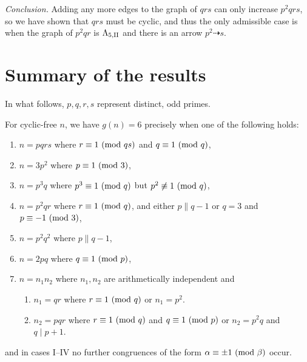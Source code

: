 \emph{Conclusion.} Adding any more edges to the graph of $qrs$ can only increase $p^2 q r s$, so we have shown that $qrs$ must be cyclic, and thus the only admissible case is when the graph of $p^2 q r$ is $\Lambda_{5,\text{II}}$ and there is an arrow $p^2 \dashrightarrow s$.

\section{Summary of the results}
In what follows, $p, q, r, s$ represent distinct, odd primes.
\begin{thm}
	For cyclic-free $n$, we have $g(n) = 6$ precisely when one of the following holds:
	\begin{enumerate} \listspace
		\item $n = pqrs$ where $r \equiv 1 \ (\mathrm{mod} \ qs)$ and $q \equiv 1 \ (\mathrm{mod} \ q)$,
		\item $n = 3p^2$ where $p \equiv 1 \ (\mathrm{mod} \ 3)$,
		\item $n = p^3 q$ where $p^3 \equiv 1 \ (\mathrm{mod} \ q)$ but $p^2 \not\equiv 1 \ (\mathrm{mod} \ q)$,
		\item $n = p^2 q r$ where $r \equiv 1 \ (\mathrm{mod} \ q)$, and either $p \parallel q - 1$ or $q = 3$ and $p \equiv -1 \ (\mathrm{mod} \ 3)$,
		\item $n = p^2 q^2$ where $p \parallel q - 1$,
		\item $n = 2pq$ where $q \equiv 1 \ (\mathrm{mod} \ p)$,
		\item $n = n_1 n_2$ where $n_1, n_2$ are arithmetically independent and
		\begin{enumerate}
			\item $n_1 = qr$ where $r \equiv 1 \ (\mathrm{mod} \ q)$ or $n_1 = p^2$.
			\item $n_2 = pqr$ where $r \equiv 1 \ (\mathrm{mod} \ q)$ and $q \equiv 1 \ (\mathrm{mod} \ p)$ or $n_2 = p^2 q$ and $q \mid p + 1$.
		\end{enumerate}
	\end{enumerate} \textspace
	and in cases I--IV no further congruences of the form $\alpha \equiv \pm 1 \ (\mathrm{mod} \ \beta)$ \nolinebreak[4] \mbox{occur}.
\end{thm}
